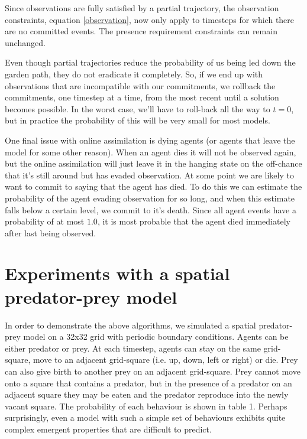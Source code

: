 \documentclass{article}
\begin{document}
Since observations are fully satisfied by a partial trajectory, the observation constraints, equation \ref{observation}, now only apply to timesteps for which there are no committed events. The presence requirement constraints can remain unchanged.

Even though partial trajectories reduce the probability of us being led down the garden path, they do not eradicate it completely. So, if we end up with observations that are incompatible with our commitments, we rollback the commitments, one timestep at a time, from the most recent until a solution becomes possible. In the worst case, we'll have to roll-back all the way to $t=0$, but in practice the probability of this will be very small for most models.

One final issue with online assimilation is dying agents (or agents that leave the model for some other reason). When an agent dies it will not be observed again, but the online assimilation will just leave it in the hanging state on the off-chance that it's still around but has evaded observation. At some point we are likely to want to commit to saying that the agent has died. To do this we can estimate the probability of the agent evading observation for so long, and when this estimate falls below a certain level, we commit to it's death. Since all agent events have a probability of at most $1.0$, it is most probable that the agent died immediately after last being observed.

\section{Experiments with a spatial predator-prey model}

In order to demonstrate the above algorithms, we simulated a spatial predator-prey model on a 32x32 grid with periodic boundary conditions. Agents can be either predator or prey. At each timestep, agents can stay on the same grid-square, move to an adjacent grid-square (i.e. up, down, left or right) or die. Prey can also give birth to another prey on an adjacent grid-square. Prey cannot move onto a square that contains a predator, but in the presence of a predator on an adjacent square they may be eaten and the predator reproduce into the newly vacant square. The probability of each behaviour is shown in table 1. Perhaps surprisingly, even a model with such a simple set of behaviours exhibits quite complex emergent properties that are difficult to predict.
\end{document}
